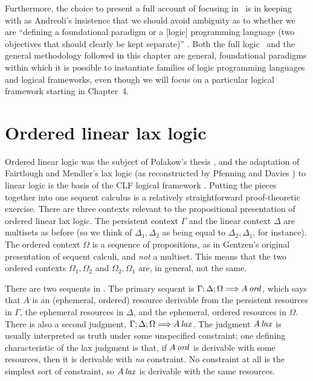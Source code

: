 Furthermore, the choice to present a full account of focusing in
\ollll~is in keeping with as Andreoli's insistence that we should
avoid ambiguity as to whether we are ``defining a foundational
paradigm or a [logic] programming language (two objectives that should
clearly be kept separate)'' \cite{andreoli01focussing}. Both the full
logic \ollll~and the general methodology followed in this chapter are
general, foundational paradigms within which it is possible to
instantiate families of logic programming languages and logical
frameworks, even though we will focus on a particular logical
framework starting in Chapter~4.

\section{Ordered linear lax logic}
\label{sec:ord-unfocused}

Ordered linear logic was the subject of Polakow's thesis
\cite{polakow01ordered}, and the adaptation of Fairtlough and
Mendler's lax logic \cite{fairtlough95propositional} (as reconstructed
by Pfenning and Davies \cite{pfenning01judgmental}) to linear logic is
the basis of the CLF logical framework
\cite{watkins02concurrent}. Putting the pieces together into one
sequent calculus is a relatively straightforward proof-theoretic
exercise. There are three contexts relevant to the propositional
presentation of ordered linear lax logic.  The persistent context
$\Gamma$ and the linear context $\Delta$ are multisets as before (so
we think of $\Delta_1, \Delta_2$ as being equal to $\Delta_2,
\Delta_1$, for instance). The ordered context $\Omega$ is a sequence
of propositions, as in Gentzen's original presentation of sequent
calculi, and {\it not} a multiset.  This means that the two ordered
contexts $\Omega_1, \Omega_2$ and $\Omega_2, \Omega_1$ are, in
general, not the same.



There are two sequents in \ollll.  The primary sequent is
${\Gamma};{\Delta};{\Omega} \Longrightarrow {{A}\,{{\it ord}}} \mathstrut$, which says that $A$ is an
(ephemeral, ordered) resource derivable from the persistent resources
in $\Gamma$, the ephemeral resources in $\Delta$, and the ephemeral,
ordered resources in $\Omega$. There is also a second judgment,
${\Gamma};{\Delta};{\Omega} \Longrightarrow {{A}\,{{\it lax}}} \mathstrut$. The judgment ${A}\,{{\it lax}}$
is usually interpreted as truth under some unspecified constraint; one
defining characteristic of the lax judgment is that, if ${A}\,{{\it ord}}$
is derivable with some resources, then it is derivable with {\it no}
constraint. No constraint at all is the simplest sort of constraint,
so ${A}\,{{\it lax}}$ is derivable with the same resources.

